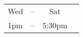  \begin{center}
   \begin{tabular}{lrcl}
     \hline
     Wed & -- & Sat \\
     1pm & -- & 5:30pm \\
     \hline
   \end{tabular}
 \end{center}


